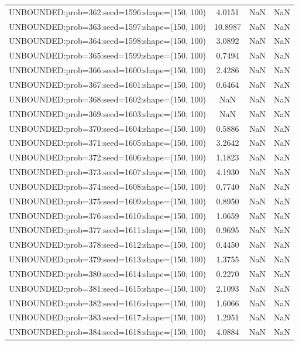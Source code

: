 \begin{longtable}{lccc}
UNBOUNDED:prob=362:seed=1596:shape=(150, 100) &  4.0151 &   NaN &    NaN \\
UNBOUNDED:prob=363:seed=1597:shape=(150, 100) & 10.8987 &   NaN &    NaN \\
UNBOUNDED:prob=364:seed=1598:shape=(150, 100) &  3.0892 &   NaN &    NaN \\
UNBOUNDED:prob=365:seed=1599:shape=(150, 100) &  0.7494 &   NaN &    NaN \\
UNBOUNDED:prob=366:seed=1600:shape=(150, 100) &  2.4286 &   NaN &    NaN \\
UNBOUNDED:prob=367:seed=1601:shape=(150, 100) &  0.6464 &   NaN &    NaN \\
UNBOUNDED:prob=368:seed=1602:shape=(150, 100) &     NaN &   NaN &    NaN \\
UNBOUNDED:prob=369:seed=1603:shape=(150, 100) &     NaN &   NaN &    NaN \\
UNBOUNDED:prob=370:seed=1604:shape=(150, 100) &  0.5886 &   NaN &    NaN \\
UNBOUNDED:prob=371:seed=1605:shape=(150, 100) &  3.2642 &   NaN &    NaN \\
UNBOUNDED:prob=372:seed=1606:shape=(150, 100) &  1.1823 &   NaN &    NaN \\
UNBOUNDED:prob=373:seed=1607:shape=(150, 100) &  4.1930 &   NaN &    NaN \\
UNBOUNDED:prob=374:seed=1608:shape=(150, 100) &  0.7740 &   NaN &    NaN \\
UNBOUNDED:prob=375:seed=1609:shape=(150, 100) &  0.8950 &   NaN &    NaN \\
UNBOUNDED:prob=376:seed=1610:shape=(150, 100) &  1.0659 &   NaN &    NaN \\
UNBOUNDED:prob=377:seed=1611:shape=(150, 100) &  0.9695 &   NaN &    NaN \\
UNBOUNDED:prob=378:seed=1612:shape=(150, 100) &  0.4450 &   NaN &    NaN \\
UNBOUNDED:prob=379:seed=1613:shape=(150, 100) &  1.3755 &   NaN &    NaN \\
UNBOUNDED:prob=380:seed=1614:shape=(150, 100) &  0.2270 &   NaN &    NaN \\
UNBOUNDED:prob=381:seed=1615:shape=(150, 100) &  2.1093 &   NaN &    NaN \\
UNBOUNDED:prob=382:seed=1616:shape=(150, 100) &  1.6066 &   NaN &    NaN \\
UNBOUNDED:prob=383:seed=1617:shape=(150, 100) &  1.2951 &   NaN &    NaN \\
UNBOUNDED:prob=384:seed=1618:shape=(150, 100) &  4.0884 &   NaN &    NaN \\

\end{longtable}
